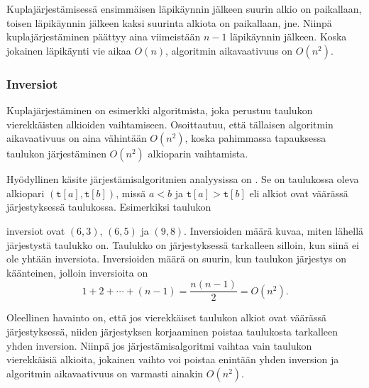 Kuplajärjestämisessä ensimmäisen läpikäynnin jälkeen suurin alkio
on paikallaan, toisen läpikäynnin jälkeen
kaksi suurinta alkiota on paikallaan, jne.
Niinpä kuplajärjestäminen päättyy aina viimeistään $n-1$
läpikäynnin jälkeen.
Koska jokainen läpikäynti vie aikaa $O(n)$,
algoritmin aikavaativuus on $O(n^2)$.

\subsubsection{Inversiot}


Kuplajärjestäminen on esimerkki algoritmista,
joka perustuu taulukon vierekkäisten alkioiden
vaihtamiseen.
Osoittautuu, että tällaisen algoritmin
aikavaativuus on aina vähintään $O(n^2)$,
koska pahimmassa tapauksessa taulukon
järjestäminen $O(n^2)$ alkioparin vaihtamista.

Hyödyllinen käsite järjestämisalgoritmien
analyysissa on .
Se on taulukossa oleva alkiopari
$(\texttt{t}[a],\texttt{t}[b])$,
missä $a<b$ ja $\texttt{t}[a]>\texttt{t}[b]$
eli alkiot ovat väärässä järjestyksessä taulukossa.
Esimerkiksi taulukon
\begin{center}
\end{center}
inversiot ovat $(6,3)$, $(6,5)$ ja $(9,8)$.
Inversioiden määrä kuvaa, miten lähellä
järjestystä taulukko on.
Taulukko on järjestyksessä tarkalleen
silloin, kun siinä ei ole yhtään inversiota.
Inversioiden määrä on suurin,
kun taulukon järjestys on käänteinen,
jolloin inversioita on
\[1+2+\cdots+(n-1)=\frac{n(n-1)}{2} = O(n^2).\]

Oleellinen havainto on,
että jos vierekkäiset taulukon alkiot
ovat väärässä järjestyksessä,
niiden järjestyksen korjaaminen
poistaa taulukosta tarkalleen yhden inversion.
Niinpä jos järjestämisalgoritmi vaihtaa vain
taulukon vierekkäisiä alkioita,
jokainen vaihto voi poistaa enintään yhden inversion
ja algoritmin aikavaativuus on varmasti ainakin $O(n^2)$.

